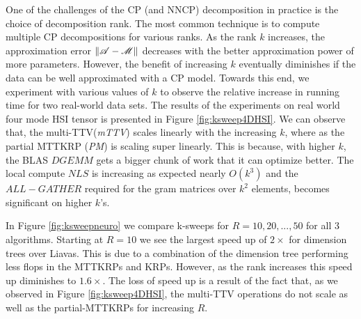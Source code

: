 One of the challenges of the CP (and NNCP) decomposition in practice is the choice of decomposition rank.
The most common technique is to compute multiple CP decompositions for various ranks.
As the rank $k$ increases, the approximation error  $\|\TA - \T{M}\|$ decreases with the better approximation power of more parameters. 
However, the benefit of increasing $k$ eventually diminishes if the data can be well approximated with a CP model.
Towards this end, we experiment with various values of $k$ to observe the relative increase in running time for two real-world data sets. 
The results of the experiments on real world four mode HSI tensor is presented in Figure \ref{fig:ksweep4DHSI}. We can observe 
that, the multi-TTV({\em mTTV}) scales linearly with the increasing $k$,  where as the partial MTTKRP ({\em PM}) is scaling super 
linearly. This is because, with higher $k$, the BLAS $DGEMM$ gets a bigger chunk of work that it can optimize better.  The local 
compute $NLS$ is increasing as expected nearly $O(k^3)$ and the $ALL-GATHER$ required for the gram matrices over $k^2$ 
elements, becomes significant on higher $k$'s. 

In Figure \ref{fig:ksweepneuro} we compare k-sweeps for $R = 10,20,...,50$ for all 3 algorithms. Starting at $R=10$ we see the largest speed up of $2\times$ for dimension trees over Liavas. This is due to a combination of the dimension tree performing less flops in the MTTKRPs and KRPs. However, as the rank increases this speed up diminishes to $1.6\times$. The loss of speed up is a result of the fact that, as we observed in Figure \ref{fig:ksweep4DHSI}, the multi-TTV operations do not scale as well as the partial-MTTKRPs for increasing $R$. 

